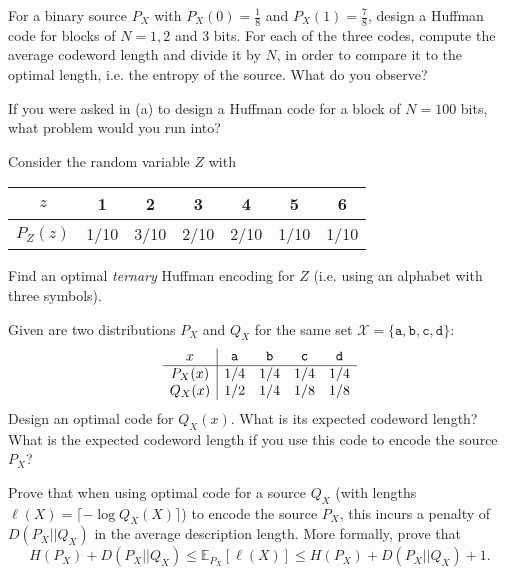 \documentclass[a4paper,10pt,landscape,twocolumn]{scrartcl}
\begin{document}
\begin{exercise}
	\begin{subex}[(4pt)]
	For a binary source $P_X$ with $P_X(0) = \frac{1}{8}$ and $P_X(1) = \frac{7}{8}$, design a Huffman code for blocks of $N = 1,2$ and 3 bits. For each of the three codes, compute the average codeword length and divide it by $N$, in order to compare it to the optimal length, i.e. the entropy of the source. What do you observe?
	\end{subex}
	\begin{subex}[(1pt)]
	If you were asked in (a) to design a Huffman code for a block of $N = 100$ bits, what problem would you run into?
	\end{subex}
	\begin{subex}[(2pt)]
	Consider the random variable $Z$ with
	\begin{center}
	\begin{tabular}{c | c c c c c c}
	$z$ & 1 & 2 & 3 & 4 & 5 & 6\\
	\hline
	$P_Z(z)$ & 1/10 & 3/10 & 2/10 & 2/10 & 1/10 & 1/10\\
	\end{tabular}
	\end{center}
	Find an optimal \emph{ternary} Huffman encoding for $Z$ (i.e. using an alphabet with three symbols).
	\end{subex}
\end{exercise}



\begin{exercise}
\begin{subex}[(2pt)]
Given are two distributions $P_X$ and $Q_X$ for the same set $\mathcal{X} = \{\mathtt{a,b,c,d}\}$:
\[
\begin{array}{c | c c c c}
x & \mathtt{a}&\mathtt{b}&\mathtt{c}&\mathtt{d}\\\hline
P_X(x) & 1/4&1/4&1/4&1/4\\
Q_X(x) & 1/2&1/4&1/8&1/8\\
\end{array}
\]
Design an optimal code for $Q_X(x)$. What is its expected codeword length? What is the expected codeword length if you use this code to encode the source $P_X$?
\end{subex}
\begin{subex}[(4pt)]
Prove that when using optimal code for a source $Q_X$ (with lengths $\ell(X) = \lceil -\log Q_X(X) \rceil$) to encode the source $P_X$, this incurs a penalty of $D(P_X||Q_X)$ in the average description length. More formally, prove that
\[
H(P_X) + D(P_X||Q_X) \leq \mathbb{E}_{P_X}[\ell(X)] \leq H(P_X) + D(P_X||Q_X) + 1.
\]
\end{subex}
\end{exercise}
\end{document}
